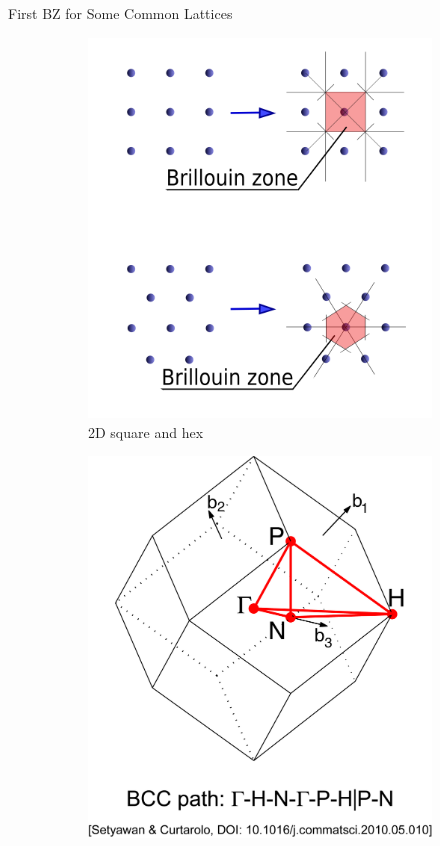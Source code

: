 \documentclass[aspectratio=169]{beamer}
\begin{document}
\begin{frame}{First BZ for Some Common Lattices}

\begin{figure}
    \centering
    \begin{subfigure}{0.24\textwidth}
        \includegraphics[width=\linewidth]{lectures/figures/7_Brillouin_Zone_2D.png}
    \caption{2D square and hex}
    \end{subfigure}
    \begin{subfigure}{0.24\textwidth}
        \includegraphics[width=\linewidth]{lectures/figures/7_Brillouin_Zone_BCC.png}

\end{subfigure}
\end{figure}
\end{frame}
\end{document}
